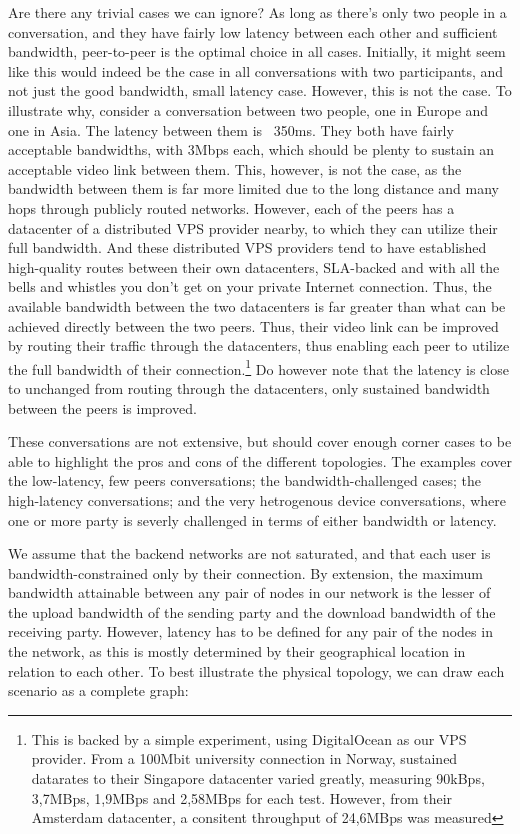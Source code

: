 Are there any trivial cases we can ignore? As long as there's only two people in a conversation, and they have fairly low latency between each other and sufficient bandwidth, peer-to-peer is the optimal choice in all cases. Initially, it might seem like this would indeed be the case in all conversations with two participants, and not just the good bandwidth, small latency case. However, this is not the case. To illustrate why, consider a conversation between two people, one in Europe and one in Asia. The latency between them is ~350ms. They both have fairly acceptable bandwidths, with 3Mbps each, which should be plenty to sustain an acceptable video link between them. This, however, is not the case, as the bandwidth between them is far more limited due to the long distance and many hops through publicly routed networks. However, each of the peers has a datacenter of a distributed VPS provider nearby, to which they can utilize their full bandwidth. And these distributed VPS providers tend to have established high-quality routes between their own datacenters, SLA-backed and with all the bells and whistles you don't get on your private Internet connection. Thus, the available bandwidth between the two datacenters is far greater than what can be achieved directly between the two peers. Thus, their video link can be improved by routing their traffic through the datacenters, thus enabling each peer to utilize the full bandwidth of their connection.\footnote{This is backed by a simple experiment, using DigitalOcean as our VPS provider. From a 100Mbit university connection in Norway, sustained datarates to their Singapore datacenter varied greatly, measuring 90kBps, 3,7MBps, 1,9MBps and 2,58MBps for each test. However, from their Amsterdam datacenter, a consitent throughput of 24,6MBps was measured} Do however note that the latency is close to unchanged from routing through the datacenters, only sustained bandwidth between the peers is improved.

These conversations are not extensive, but should cover enough corner cases to be able to highlight the pros and cons of the different topologies. The examples cover the low-latency, few peers conversations; the bandwidth-challenged cases; the high-latency conversations; and the very hetrogenous device conversations, where one or more party is severly challenged in terms of either bandwidth or latency.

We assume that the backend networks are not saturated, and that each user is bandwidth-constrained only by their connection. By extension, the maximum bandwidth attainable between any pair of nodes in our network is the lesser of the upload bandwidth of the sending party and the download bandwidth of the receiving party. However, latency has to be defined for any pair of the nodes in the network, as this is mostly determined by their geographical location in relation to each other. To best illustrate the physical topology, we can draw each scenario as a complete graph:

